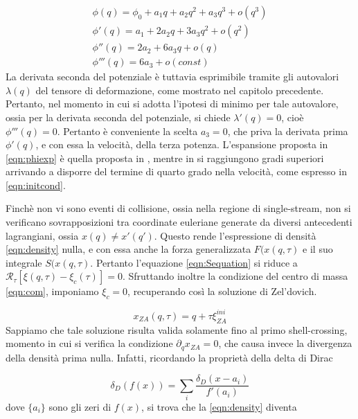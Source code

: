 \begin{gather}
    \label{eqn:phiexp}
    \phi(q) = \phi_0 + a_1 q + a_2 q^2 + a_3 q^3 + o(q^3) \\
    \phi'(q) = a_1 + 2 a_2 q + 3 a_3 q^2 + o(q^2) \\
    \phi''(q) = 2a_2 +6a_3 q + o(q) \\
    \phi'''(q) = 6a_3 + o(const) 
\end{gather}
La derivata seconda del potenziale è tuttavia esprimibile tramite gli autovalori $\lambda(q)$ del tensore di deformazione,
come mostrato nel capitolo precedente. Pertanto, nel momento in cui si adotta l'ipotesi di minimo per tale autovalore,
ossia per la derivata seconda del potenziale, si chiede $\lambda'(q)=0$, cioè $\phi'''(q)=0$. Pertanto è conveniente la
scelta $a_3 = 0$, che priva la derivata prima $\phi'(q)$, e con essa la velocità, della terza potenza.
L'espansione proposta in \ref{eqn:phiexp} è quella proposta in \cite{colombi}, mentre in \cite{rampf} si 
raggiungono gradi superiori arrivando a disporre del termine di quarto grado nella velocità, come espresso in \ref{eqn:initcond}.

Finchè non vi sono eventi di collisione, ossia nella regione di single-stream, non si verificano 
sovrapposizioni tra coordinate euleriane generate da diversi antecedenti lagrangiani, ossia $x(q)\neq x'(q')$.
Questo rende l'espressione di densità \ref{eqn:density} nulla, e con essa anche la forza generalizzata
$F(x(q, \tau)$ e il suo integrale $S(x(q, \tau)$. Pertanto l'equazione \ref{eqn:Sequation} si riduce
a $\mathcal{R}_{\tau}[\xi(q, \tau)-\xi_c(\tau)] = 0$. Sfruttando inoltre la condizione del centro di 
massa \ref{eqn:com}, imponiamo $\xi_c = 0$, recuperando così la soluzione di Zel'dovich.

\begin{equation}
    x_{ZA}(q, \tau) = q+ \tau \xi_{ZA}^{ini}
\end{equation}
Sappiamo che tale soluzione risulta valida solamente fino al primo shell-crossing, momento in cui si verifica
la condizione $\partial_q x_{ZA} = 0$, che causa invece la divergenza della densità prima nulla.
Infatti, ricordando la proprietà della delta di Dirac

\begin{equation}
    \label{eqn:dirac}
    \delta_D(f(x)) = \sum_i \frac{\delta_D(x-a_i)}{f'(a_i)}
\end{equation}
dove $\{a_i\}$ sono gli zeri di $f(x)$, si trova che la \ref{eqn:density} diventa

